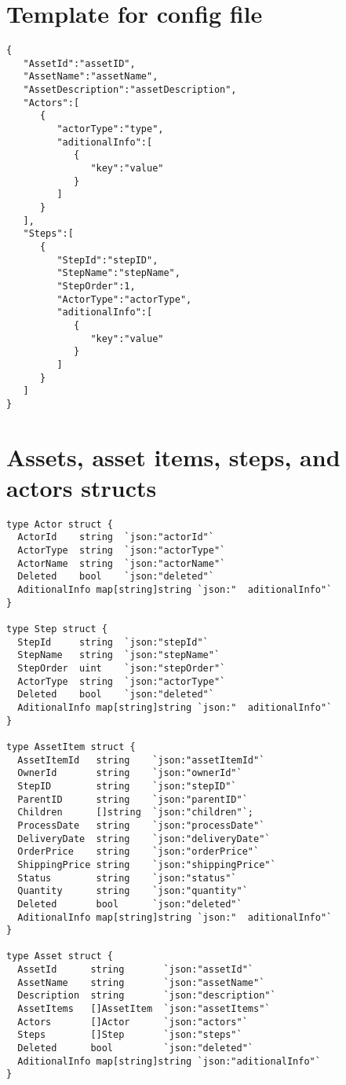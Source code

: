 \section{Template for config file}{} %
\label{app:template}

\begin{verbatim}
{
   "AssetId":"assetID",
   "AssetName":"assetName",
   "AssetDescription":"assetDescription",
   "Actors":[
      {
         "actorType":"type",
         "aditionalInfo":[
            {
               "key":"value"
            }
         ]
      }
   ],
   "Steps":[
      {
         "StepId":"stepID",
         "StepName":"stepName",
         "StepOrder":1,
         "ActorType":"actorType",
         "aditionalInfo":[
            {
               "key":"value"
            }
         ]
      }
   ]
}
\end{verbatim}

\section{Assets, asset items, steps, and actors structs}{} %
\label{app:structs}


\begin{verbatim}
type Actor struct {
  ActorId    string  `json:"actorId"`
  ActorType  string  `json:"actorType"`
  ActorName  string  `json:"actorName"`
  Deleted    bool    `json:"deleted"`
  AditionalInfo map[string]string `json:"  aditionalInfo"`
}

type Step struct {
  StepId     string  `json:"stepId"`
  StepName   string  `json:"stepName"`
  StepOrder  uint    `json:"stepOrder"`
  ActorType  string  `json:"actorType"`
  Deleted    bool    `json:"deleted"`
  AditionalInfo map[string]string `json:"  aditionalInfo"`
}

type AssetItem struct {
  AssetItemId   string    `json:"assetItemId"`
  OwnerId       string    `json:"ownerId"`
  StepID        string    `json:"stepID"`
  ParentID      string    `json:"parentID"`
  Children      []string  `json:"children"`;
  ProcessDate   string    `json:"processDate"`
  DeliveryDate  string    `json:"deliveryDate"`
  OrderPrice    string    `json:"orderPrice"`
  ShippingPrice string    `json:"shippingPrice"`
  Status        string    `json:"status"`
  Quantity      string    `json:"quantity"`
  Deleted       bool      `json:"deleted"`
  AditionalInfo map[string]string `json:"  aditionalInfo"`
}

type Asset struct {
  AssetId      string       `json:"assetId"`
  AssetName    string       `json:"assetName"`
  Description  string       `json:"description"`
  AssetItems   []AssetItem  `json:"assetItems"`
  Actors       []Actor      `json:"actors"`
  Steps        []Step       `json:"steps"`
  Deleted      bool         `json:"deleted"`
  AditionalInfo map[string]string `json:"aditionalInfo"`
}
\end{verbatim}

